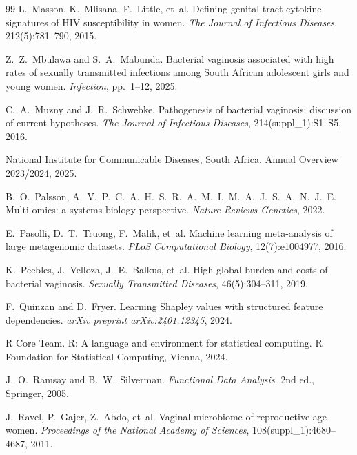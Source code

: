 \documentclass[12pt,a4paper]{report}
\begin{document}
\begin{thebibliography}{99}
L.~Masson, K.~Mlisana, F.~Little, et~al.
\newblock Defining genital tract cytokine signatures of HIV susceptibility in women.
\newblock \textit{The Journal of Infectious Diseases}, 212(5):781--790, 2015.

Z.~Z.~Mbulawa and S.~A.~Mabunda.
\newblock Bacterial vaginosis associated with high rates of sexually transmitted infections among South African adolescent girls and young women.
\newblock \textit{Infection}, pp.~1--12, 2025.

C.~A.~Muzny and J.~R.~Schwebke.
\newblock Pathogenesis of bacterial vaginosis: discussion of current hypotheses.
\newblock \textit{The Journal of Infectious Diseases}, 214(suppl\_1):S1--S5, 2016.

National Institute for Communicable Diseases, South Africa.
\newblock Annual Overview 2023/2024, 2025.

B.~\=O.~Palsson, A.~V.~P.~C.~A.~H.~S.~R.~A.~M.~I.~M.~A.~J.~S.~A.~N.~J.~E.
\newblock Multi-omics: a systems biology perspective.
\newblock \textit{Nature Reviews Genetics}, 2022.

E.~Pasolli, D.~T.~Truong, F.~Malik, et~al.
\newblock Machine learning meta-analysis of large metagenomic datasets.
\newblock \textit{PLoS Computational Biology}, 12(7):e1004977, 2016.

K.~Peebles, J.~Velloza, J.~E.~Balkus, et~al.
\newblock High global burden and costs of bacterial vaginosis.
\newblock \textit{Sexually Transmitted Diseases}, 46(5):304--311, 2019.

F.~Quinzan and D.~Fryer.
\newblock Learning Shapley values with structured feature dependencies.
\newblock \textit{arXiv preprint arXiv:2401.12345}, 2024.

R Core Team.
\newblock R: A language and environment for statistical computing.
\newblock R Foundation for Statistical Computing, Vienna, 2024.

J.~O.~Ramsay and B.~W.~Silverman.
\newblock \textit{Functional Data Analysis}. 2nd ed., Springer, 2005.

J.~Ravel, P.~Gajer, Z.~Abdo, et~al.
\newblock Vaginal microbiome of reproductive-age women.
\newblock \textit{Proceedings of the National Academy of Sciences}, 108(suppl\_1):4680--4687, 2011.


\end{thebibliography}
\end{document}
